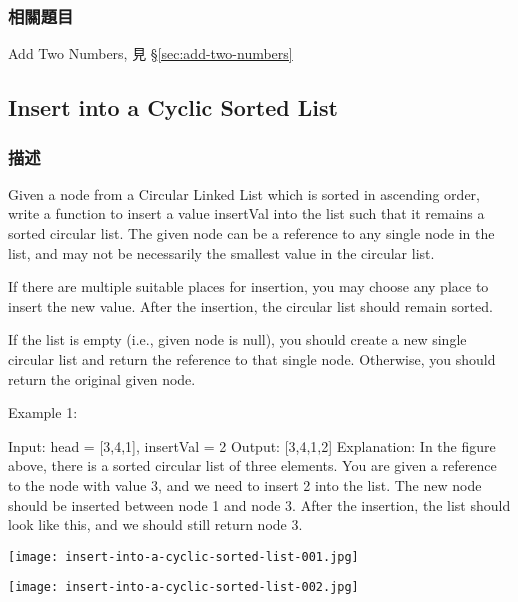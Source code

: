 \subsubsection{相關題目}

\begindot
\item Add Two Numbers, 見 \S \ref{sec:add-two-numbers}
\myenddot

\subsection{Insert into a Cyclic Sorted List}
\label{sec:insert-into-a-cyclic-sorted-list}


\subsubsection{描述}
Given a node from a Circular Linked List which is sorted in ascending order, write a function to insert a value insertVal into the list such that it remains a sorted circular list. The given node can be a reference to any single node in the list, and may not be necessarily the smallest value in the circular list.

If there are multiple suitable places for insertion, you may choose any place to insert the new value. After the insertion, the circular list should remain sorted.

If the list is empty (i.e., given node is null), you should create a new single circular list and return the reference to that single node. Otherwise, you should return the original given node.

Example 1:
\begin{Code}
Input: head = [3,4,1], insertVal = 2
Output: [3,4,1,2]
Explanation: In the figure above, there is a sorted circular list of three elements. You are given a reference to the node with value 3, and we need to insert 2 into the list. The new node should be inserted between node 1 and node 3. After the insertion, the list should look like this, and we should still return node 3.
\end{Code}

\begin{center}
\texttt{[image: insert-into-a-cyclic-sorted-list-001.jpg]}\\
\label{fig:insert-into-a-cyclic-sorted-list-001}
\end{center}

\begin{center}
\texttt{[image: insert-into-a-cyclic-sorted-list-002.jpg]}\\
\label{fig:insert-into-a-cyclic-sorted-list-002}
\end{center}


